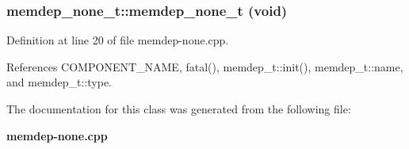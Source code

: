 \subsubsection[{memdep\_\-none\_\-t}]{\setlength{\rightskip}{0pt plus 5cm}memdep\_\-none\_\-t::memdep\_\-none\_\-t (void)\hspace{0.3cm}{\tt  [inline]}}\label{classmemdep__none__t_018f91f036c926a6578756ea0cedf684}




Definition at line 20 of file memdep-none.cpp.

References COMPONENT\_\-NAME, fatal(), memdep\_\-t::init(), memdep\_\-t::name, and memdep\_\-t::type.

The documentation for this class was generated from the following file:\begin{CompactItemize}
\item 
{\bf memdep-none.cpp}\end{CompactItemize}
